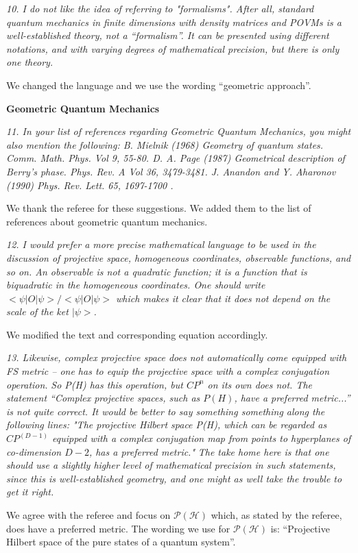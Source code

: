 \documentclass{article}
\newcommand{\REVIEW}[1]{{ \it \textcolor{reviewblack}{#1}}}
\newcommand{\REPLY}[1]{\textcolor{UCDBlue}{#1}}
\begin{document}
\REVIEW{10. I do not like the idea of referring to "formalisms". After all, standard quantum mechanics in finite dimensions with density matrices and POVMs is a well-established theory, not a “formalism”. It can be presented using different notations, and with varying degrees of mathematical precision, but there is only one theory.}

\REPLY{We changed the language and we use the wording ``geometric approach''.}

{\bf Geometric Quantum Mechanics}

\REVIEW{11. In your list of references regarding Geometric Quantum Mechanics, you might also mention the following:
B. Mielnik (1968) Geometry of quantum states. Comm. Math. Phys. Vol 9, 55-80.
D. A. Page (1987) Geometrical description of Berry's phase. Phys. Rev. A Vol 36, 3479-3481.
J. Anandon and Y. Aharonov (1990) Phys. Rev. Lett. 65, 1697-1700 .
}

\REPLY{We thank the referee for these suggestions. We added them to the list of references about geometric quantum mechanics.}

\REVIEW{12. I would prefer a more precise mathematical language to be used in the discussion of projective space, homogeneous coordinates, observable functions, and so on. An observable is not a quadratic function; it is a function that is biquadratic in the homogeneous coordinates. One should write $< \psi | O | \psi > / < \psi | O | \psi >$ which makes it clear that it does not depend on the scale of the ket $| \psi >$.}

\REPLY{We modified the text and corresponding equation accordingly.}

\REVIEW{13. Likewise, complex projective space does not automatically come equipped with FS metric -- one has to equip the projective space with a complex conjugation operation.}
\REVIEW{So P(H) has this operation, but $CP^n$ on its own does not. The statement ``Complex projective spaces, such as $P(H)$, have a preferred metric...'' is not quite correct. It would be better to say something something along the following lines: "The projective Hilbert space P(H), which can be regarded as $CP^(D-1)$ equipped with a complex conjugation map from points to hyperplanes of co-dimension $D-2$, has a preferred metric."}
\REVIEW{The take home here is that one should use a slightly higher level of mathematical precision in such statements, since this is well-established geometry, and one might as well take the trouble to get it right.}

\REPLY{We agree with the referee and focus on $\mathcal{P}(\mathcal{H})$ which, as stated by the referee, does have a preferred metric. The wording we use for $\mathcal{P}(\mathcal{H})$ is: ``Projective Hilbert space of the pure states of a quantum system''.}
\end{document}
